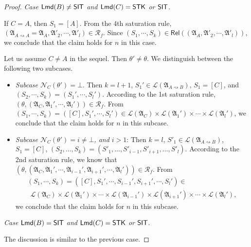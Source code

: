 \documentclass[preprint,12pt]{elsarticle}
\newcommand\act{{\sf Act}}
\newcommand\lmd{{\sf Lmd}}
\newcommand\singletask{{\sf STK}}
\newcommand\singleinstance{{\sf SIT}}
\newcommand\namefun{\mathcal{N}}
\newcommand\AutReach{\mathscr{R}}
\newcommand\Rel{\mathsf{Rel}}
\newcommand\Aut{{\mathfrak{A} }}
\newcommand\Lang{{\mathscr{L} }}
\newcommand\ConfSet{{\mathscr{C} }}
\begin{document}
\begin{proof}
\smallskip

\noindent \emph{Case $\lmd(B) \neq \singleinstance$ and $\lmd(C) = \singletask$ or $\singleinstance$}. 

If $C = A$, then $S_1 = [A]$. From the 4th saturation rule, $(\Aut_{A \rightsquigarrow A} = \Aut_A, \Aut'_2, \cdots, \Aut'_l) \in \AutReach_f$. Since $(S_1, \cdots, S_k) \in \Rel((\Aut_A, \Aut'_2, \cdots, \Aut'_l))$, we conclude that the claim holds for $n$ in this case. 

Let us assume $C \neq A$ in the sequel.  Then $\theta' \neq \theta$.  We distinguish between the following two subcases. 
\begin{itemize}
    \item \emph{Subcase $\namefun_{C}(\theta') = \bot$}. Then $k=l+1$, $S_1' \in \Lang(\Aut_{A\rightsquigarrow B})$, $S_1=[C]$, and $(S_2,\cdots,S_k)=(S_1',\cdots,S_l')$.  According to the 1st saturation rule, $(\theta, (\Aut_{C}, \Aut_1', \cdots, \Aut_l')) \in \AutReach_f$.
   From $(S_1, \cdots, S_k) = ([C], S_1', \cdots, S_l') \in \Lang(\Aut_{C}) \times \Lang(\Aut_1') \times \cdots \times \Lang(\Aut_l')$, we conclude that the claim holds for $n$ in this subcase.
    \item \emph{Subcase $\namefun_{C}(\theta') = i \neq \bot$, and $i > 1$}: Then $k = l$, 
    $S'_1  \in \Lang(\Aut_{A\rightsquigarrow B})$, $S_1 = [C]$, $(S_2, \dots, S_k) = (S'_1, \dots, S'_{i-1}, S'_{i+1}, \dots, S'_l)$. According to the 2nd saturation rule, we know that $(\theta, (\Aut_{C}, \Aut_1',\cdots, \Aut_{i-1}', \Aut_{i+1}', \cdots, \Aut_{l}')) \in \AutReach_f$. 
    From 
    $$
    \begin{array}{l}
    	(S_1,\cdots,S_k) = ([C], S_1', \cdots, S_{i-1}', S_{i+1}', \cdots, S_l') \in \\
    	\ \ \Lang(\Aut_{C}) \times \Lang(\Aut_1') \times \cdots \times \Lang(\Aut_{i-1}') \times \Lang(\Aut_{i+1}')\times \cdots \times \Lang(\Aut_{l}'),
    \end{array}
    $$  
    we conclude that the claim holds for $n$ in this subcase. 
%
\end{itemize}

\smallskip

\noindent \emph{Case $\lmd(B) = \singleinstance$ and $\lmd(C) = \singletask$ or $\singleinstance$}. 

The discussion is similar to the previous case. 



\end{proof}
\end{document}
